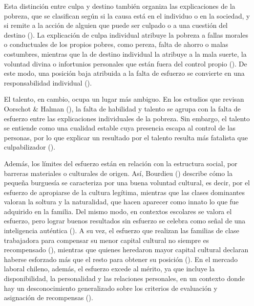 \documentclass[
  spanish,
  a4paper,
  oneside]{scrbook}
\begin{document}
Esta distinción entre culpa y destino también organiza las explicaciones
de la pobreza, que se clasifican según si la causa está en el individuo
o en la sociedad, y si remite a la acción de alguien que puede ser
culpado o a una cuestión del destino
().
La explicación de culpa individual atribuye la pobreza a fallas morales
o conductuales de los propios pobres, como pereza, falta de ahorro o
malas costumbres, mientras que la de destino individual la atribuye a la
mala suerte, la voluntad divina o infortunios personales que están fuera
del control propio (). De este modo, una posición baja atribuida a la
falta de esfuerzo se convierte en una responsabilidad individual
().

El talento, en cambio, ocupa un lugar más ambiguo. En los estudios que
revisan Oorschot \& Halman (), la falta de habilidad y talento se agrupa con la falta de esfuerzo
entre las explicaciones individuales de la pobreza. Sin embargo, el
talento se entiende como una cualidad estable cuya presencia escapa al
control de las personas, por lo que explicar un resultado por el talento
resulta más fatalista que culpabilizador
().

Además, los límites del esfuerzo están en relación con la estructura
social, por barreras materiales o culturales de origen. Así, Bourdieu
() describe cómo la pequeña
burguesía se caracteriza por una buena voluntad cultural, es decir, por
el esfuerzo de apropiarse de la cultura legítima, mientras que las
clases dominantes valoran la soltura y la naturalidad, que hacen
aparecer como innato lo que fue adquirido en la familia. Del mismo modo,
en contextos escolares se valora el esfuerzo, pero lograr buenos
resultados sin esfuerzo se celebra como señal de una inteligencia
auténtica (). A su vez, el esfuerzo que realizan las familias de clase
trabajadora para compensar su menor capital cultural no siempre es
recompensado (), mientras que quienes heredaron mayor capital cultural declaran
haberse esforzado más que el resto para obtener su posición
(). En
el mercado laboral chileno, además, el esfuerzo excede al mérito, ya que
incluye la disponibilidad, la personalidad y las relaciones personales,
en un contexto donde hay un desconocimiento generalizado sobre los
criterios de evaluación y asignación de recompensas
().
\end{document}
